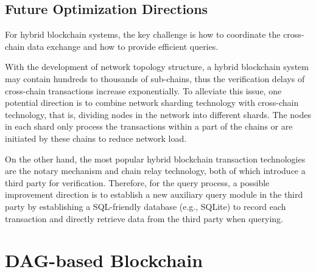 \documentclass[acmsmall]{acmart}
\begin{document}
\subsection{Future Optimization Directions}


For hybrid blockchain systems, the key challenge is how to coordinate the cross-chain data exchange and how to provide efficient queries.

With the development of network topology structure, a hybrid blockchain system may contain hundreds to thousands of sub-chains, thus the verification delays of cross-chain transactions increase exponentially. 
To alleviate this issue, one potential direction is to combine network sharding technology with cross-chain technology, that is, dividing nodes in the network into different shards. The nodes in each shard only process the transactions within a part of the chains or are initiated by these chains to reduce network load.


On the other hand, the most popular hybrid blockchain transaction technologies are the notary mechanism and chain relay technology, both of which introduce a third party for verification. Therefore, for the query process, a possible improvement direction is to establish a new auxiliary query module in the third party by establishing a SQL-friendly database (e.g., SQLite) to record each transaction and directly retrieve data from the third party when querying.




\section{DAG-based Blockchain}
\label{sec:dag}
\end{document}
